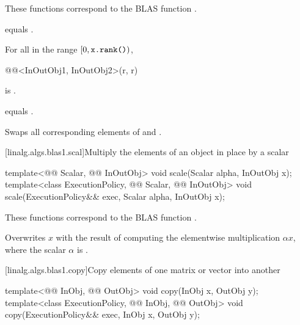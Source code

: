 \begin{itemdescr}
\pnum
\begin{note}
These functions correspond to the BLAS function \supercite{blas1}.
\end{note}

\pnum
\constraints
{} equals .

\pnum
\mandates
For all  in the range $[0, \tcode{x.rank()})$,
\begin{codeblock}
@@<InOutObj1, InOutObj2>(r, r)
\end{codeblock}
is .

\pnum
\expects
{} equals .

\pnum
\effects
Swaps all corresponding elements of  and .
\end{itemdescr}

[linalg.algs.blas1.scal]{Multiply the elements of an object in place by a scalar}

%
\begin{itemdecl}
template<@@ Scalar, @@ InOutObj>
  void scale(Scalar alpha, InOutObj x);
template<class ExecutionPolicy, @@ Scalar, @@ InOutObj>
  void scale(ExecutionPolicy&& exec, Scalar alpha, InOutObj x);
\end{itemdecl}

\begin{itemdescr}
\pnum
\begin{note}
These functions correspond to the BLAS function \supercite{blas1}.
\end{note}

\pnum
\effects
Overwrites $x$ with the result of
computing the elementwise multiplication $\alpha x$,
where the scalar $\alpha$ is .
\end{itemdescr}

[linalg.algs.blas1.copy]{Copy elements of one matrix or vector into another}

%
\begin{itemdecl}
template<@@ InObj, @@ OutObj>
  void copy(InObj x, OutObj y);
template<class ExecutionPolicy, @@ InObj, @@ OutObj>
  void copy(ExecutionPolicy&& exec, InObj x, OutObj y);
\end{itemdecl}

